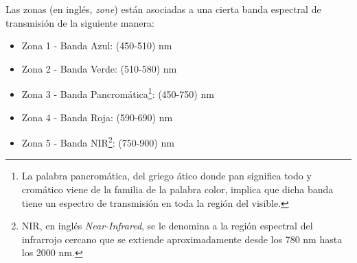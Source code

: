 \begin{figure}[H]
\begin{floatrow}
	\end{floatrow}
\end{figure}
Las zonas (en inglés, \textit{zone}) están asociadas a una cierta banda espectral de transmisión de la siguiente manera:
\begin{itemize}
\justifying
\item Zona 1 - Banda Azul: (450-510) nm
\item Zona 2 - Banda Verde: (510-580) nm
\item Zona 3 - Banda Pancromática\footnote{La palabra pancromática, del griego ático donde pan significa todo y cromático viene de la familia de la palabra color, implica que dicha banda tiene un espectro de transmisión en toda la región del visible.}: (450-750) nm
\item Zona 4 - Banda Roja: (590-690) nm
\item Zona 5 - Banda NIR\footnote{NIR, en inglés \textit{Near-Infrared}, se le denomina a la región espectral del infrarrojo cercano que se extiende aproximadamente desde los 780 nm hasta los 2000 nm.}: (750-900) nm
\end{itemize}
 




